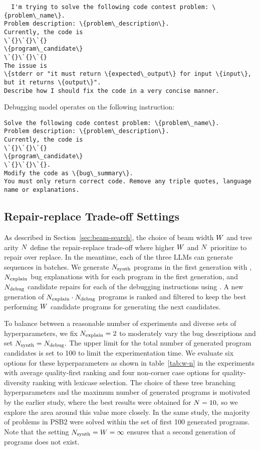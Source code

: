 \begin{lstlisting}
  I'm trying to solve the following code contest problem: \{problem\_name\}. 
Problem description: \{problem\_description\}.
Currently, the code is 
\`{}\`{}\`{}
\{program\_candidate\}
\`{}\`{}\`{}
The issue is 
\{stderr or "it must return \{expected\_output\} for input \{input\}, but it returns \{output\}".
Describe how I should fix the code in a very concise manner.
\end{lstlisting}

Debugging model \debugmodel{} operates on the following instruction:

\begin{lstlisting}
Solve the following code contest problem: \{problem\_name\}.
Problem description: \{problem\_description\}.
Currently, the code is 
\`{}\`{}\`{}
\{program\_candidate\}
\`{}\`{}\`{}.
Modify the code as \{bug\_summary\}.
You must only return correct code. Remove any triple quotes, language name or explanations.
\end{lstlisting}


\subsection{Repair-replace Trade-off Settings}
\label{sec:trade-off-settings}

As described in Section~\ref{sec:beam-search}, the choice of beam width $W{}$ and tree arity $N{}$ define the repair-replace trade-off where higher $W{}$ and $N{}$ prioritize to repair over replace. 
In the meantime, each of the three LLMs can generate sequences in batches. 
We generate $N_\text{synth}{}$ programs in the first generation with \synthmodel{}, $N_\text{explain}{}$ bug explanations with \textmodel{} for each program in the first generation, and $N_\text{debug}{}$ candidate repairs for each of the debugging instructions using \debugmodel{}.
A new generation of $N_\text{explain}{} \cdot N_\text{debug}{}$ programs is ranked and filtered to keep the best performing $W{}$ candidate programs for generating the next candidates. 

To balance between a reasonable number of experiments and diverse sets of hyperparameters, we fix $N_\text{explain}{}=2$ to moderately vary the bug descriptions and set $N_\text{synth}{} = N_\text{debug}{}.$
The upper limit for the total number of generated program candidates is set to 100 to limit the experimentation time. 
We evaluate six options for these hyperparameters as shown in table~\ref{tab:w-n} in the experiments with average quality-first ranking and four non-corner case options for quality-diversity ranking with lexicase selection. 
The choice of these tree branching hyperparameters and the maximum number of generated programs is motivated by the earlier study, where the best results were obtained for $N{}=10,$ so we explore the area around this value more closely.
In the same study, the majority of problems in PSB2 were solved within the set of first 100 generated programs. Note that the setting $N_\text{synth}{}=W{}=\infty$ ensures that a second generation of programs does not exist.

